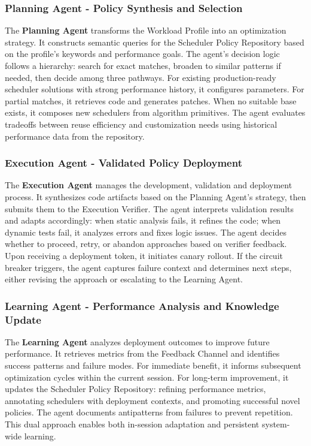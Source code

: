 \subsubsection{Planning Agent - Policy Synthesis and Selection}

The \textbf{Planning Agent} transforms the Workload Profile into an optimization strategy. It constructs semantic queries for the Scheduler Policy Repository based on the profile's keywords and performance goals. The agent's decision logic follows a hierarchy: search for exact matches, broaden to similar patterns if needed, then decide among three pathways. For existing production-ready scheduler solutions with strong performance history, it configures parameters. For partial matches, it retrieves code and generates patches. When no suitable base exists, it composes new schedulers from algorithm primitives. The agent evaluates tradeoffs between reuse efficiency and customization needs using historical performance data from the repository.

\subsubsection{Execution Agent - Validated Policy Deployment}

The \textbf{Execution Agent} manages the development, validation and deployment process. It synthesizes code artifacts based on the Planning Agent's strategy, then submits them to the Execution Verifier. The agent interprets validation results and adapts accordingly: when static analysis fails, it refines the code; when dynamic tests fail, it analyzes errors and fixes logic issues. The agent decides whether to proceed, retry, or abandon approaches based on verifier feedback. Upon receiving a deployment token, it initiates canary rollout. If the circuit breaker triggers, the agent captures failure context and determines next steps, either revising the approach or escalating to the Learning Agent.

\subsubsection{Learning Agent - Performance Analysis and Knowledge Update}

The \textbf{Learning Agent} analyzes deployment outcomes to improve future performance. It retrieves metrics from the Feedback Channel and identifies success patterns and failure modes. For immediate benefit, it informs subsequent optimization cycles within the current session. For long-term improvement, it updates the Scheduler Policy Repository: refining performance metrics, annotating schedulers with deployment contexts, and promoting successful novel policies. The agent documents antipatterns from failures to prevent repetition. This dual approach enables both in-session adaptation and persistent system-wide learning.


